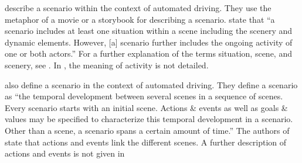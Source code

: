 \textcite{geyer2014} describe a scenario within the context of automated driving. They use the metaphor of a movie or a storybook for describing a scenario. \textcite{geyer2014} state that ``a scenario includes at least one situation within a scene including the scenery and dynamic elements. However, [a] scenario further includes the ongoing activity of one or both actors.'' For a further explanation of the terms situation, scene, and scenery, see \autocite{geyer2014}. 
In \autocite{geyer2014}, the meaning of activity is not detailed.

\textcite{ulbrich2015} also define a scenario in the context of automated driving. They define a scenario as ``the temporal development between several scenes in a sequence of scenes. Every scenario starts with an initial scene. Actions \& events as well as goals \& values may be specified to characterize this temporal development in a scenario. Other than a scene, a scenario spans a certain amount of time.'' The authors of \autocite{ulbrich2015} state that actions and events link the different scenes. A further description of actions and events is not given in \autocite{ulbrich2015}


